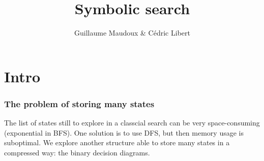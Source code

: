 \documentclass[10pt,a4paper]{beamer}
\author{Guillaume Maudoux \& Cédric Libert}
\title{Symbolic search}
\begin{document}
\maketitle
\begin{frame}
\tableofcontents
\end{frame}
\section{Intro}
\begin{frame}
\frametitle{The problem of storing many states}

The list of states still to explore in a classcial search can be very space-consuming (exponential in BFS).  One solution is to use DFS, but then memory usage is suboptimal.  We explore another structure able to store many states in a compressed way: the binary decision diagrams.

\end{frame}
\end{document}
